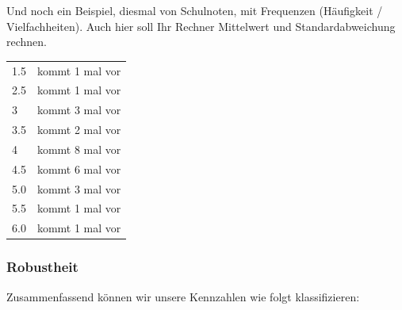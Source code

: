 

Und noch ein Beispiel, diesmal von Schulnoten, mit Frequenzen
(Häufigkeit / Vielfachheiten). Auch hier soll Ihr Rechner Mittelwert und
Standardabweichung rechnen.

\begin{tabular}{ll}
1.5 & kommt 1 mal vor\\
2.5 & kommt 1 mal vor\\
3   & kommt 3 mal vor\\
3.5 & kommt 2 mal vor\\
4   & kommt 8 mal vor\\
4.5 & kommt 6 mal vor\\
5.0 & kommt 3 mal vor\\
5.5 & kommt 1 mal vor\\
6.0 & kommt 1 mal vor
\end{tabular}




\newpage
\subsubsection{Robustheit}
Zusammenfassend können wir unsere Kennzahlen wie folgt klassifizieren:

